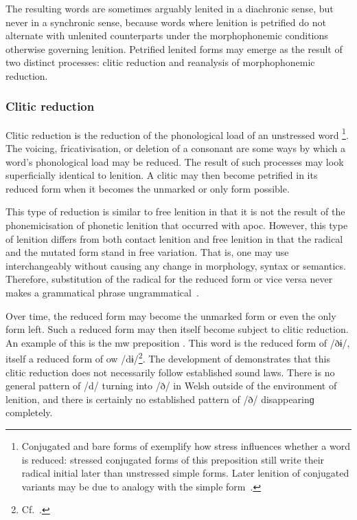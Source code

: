 The resulting words are sometimes  arguably lenited in a diachronic sense, but never in a synchronic sense, because words where lenition is petrified do not alternate with unlenited counterparts under the morphophonemic conditions otherwise governing lenition. Petrified lenited forms may emerge as the result of two distinct processes: clitic reduction and reanalysis of morphophonemic reduction.

\subsubsection{Clitic reduction}
\label{sec:clitic-reduction}
Clitic reduction is the reduction of the phonological load of an unstressed word%
\footnote{Conjugated and bare forms of  exemplify how stress influences whether a word is reduced: stressed conjugated forms of this preposition still write their radical initial later than unstressed simple forms. Later lenition of conjugated variants may be due to analogy with the simple form~\autocite[54]{jongeleen_lenition_2016}.}. 
The voicing, fricativisation, or deletion of a consonant are some ways by which a word's phonological load may be reduced.
The result of such processes may look superficially identical to lenition.
A clitic may then become petrified in its reduced form when it becomes the unmarked or only form possible. 

This type of reduction is similar to free lenition in that it is not the result of the phonemicisation of phonetic lenition that occurred with \gls{apoc}.
However, this type of lenition differs from both contact lenition and free lenition in that the radical and the mutated form stand in free variation.
That is, one may use  interchangeably without causing any change in morphology, syntax or semantics. 
Therefore, substitution of the radical for the reduced form or vice versa never makes a grammatical phrase ungrammatical~\autocite[451--453]{morgan_y_1952}. 

Over time, the reduced form may become the unmarked form or even the only form left. 
Such a reduced form may then itself become subject to clitic reduction. 
An example of this is the \gls{mw} preposition . 
This word is the reduced form of  /ðɨ/, itself a reduced form of \gls{ow}  /dɨ/\footnote{Cf.\ .}. 
The development of  demonstrates that this clitic reduction does not necessarily follow established sound laws. 
There is no general pattern of /d/ turning into /ð/ in Welsh outside of the environment of lenition, and there is certainly no established pattern of /ð/ disappearinɡ completely.

